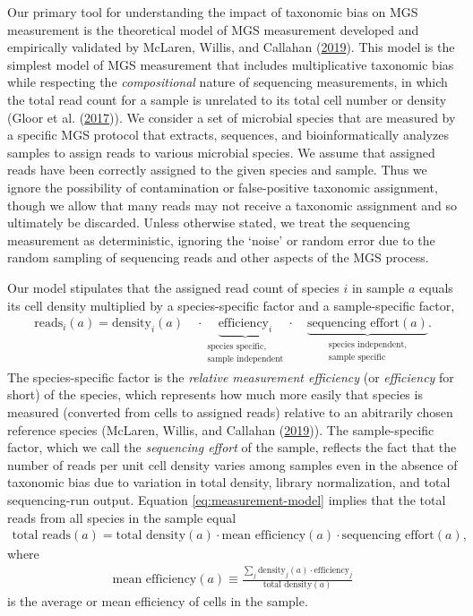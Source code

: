 \documentclass[
]{article}
\begin{document}
Our primary tool for understanding the impact of taxonomic bias on MGS measurement is the theoretical model of MGS measurement developed and empirically validated by McLaren, Willis, and Callahan (\protect\hyperlink{ref-mclaren2019cons}{2019}).
This model is the simplest model of MGS measurement that includes multiplicative taxonomic bias while respecting the \emph{compositional} nature of sequencing measurements, in which the total read count for a sample is unrelated to its total cell number or density (Gloor et al. (\protect\hyperlink{ref-gloor2017micr}{2017})).
We consider a set of microbial species that are measured by a specific MGS protocol that extracts, sequences, and bioinformatically analyzes samples to assign reads to various microbial species.
We assume that assigned reads have been correctly assigned to the given species and sample.
Thus we ignore the possibility of contamination or false-positive taxonomic assignment, though we allow that many reads may not receive a taxonomic assignment and so ultimately be discarded.
Unless otherwise stated, we treat the sequencing measurement as deterministic, ignoring the `noise' or random error due to the random sampling of sequencing reads and other aspects of the MGS process.

Our model stipulates that the assigned read count of species \(i\) in sample \(a\) equals its cell density multiplied by a species-specific factor and a sample-specific factor,
\begin{align}
  \label{eq:measurement-model}
  \text{reads}_{i}(a)
  = \text{density}_{i}(a) \quad \cdot
    \underbrace{\text{efficiency}_{i}}_{\substack{\text{species specific,} \\  \text{sample independent}}}
    \cdot \quad
    \underbrace{\text{sequencing effort}(a)}_{\substack{\text{species independent,} \\  \text{sample specific}}}.
\end{align}
The species-specific factor is the \emph{relative measurement efficiency} (or \emph{efficiency} for short) of the species, which represents how much more easily that species is measured (converted from cells to assigned reads) relative to an abitrarily chosen reference species (McLaren, Willis, and Callahan (\protect\hyperlink{ref-mclaren2019cons}{2019})).
The sample-specific factor, which we call the \emph{sequencing effort} of the sample, reflects the fact that the number of reads per unit cell density varies among samples even in the absence of taxonomic bias due to variation in total density, library normalization, and total sequencing-run output.
Equation \eqref{eq:measurement-model} implies that the total reads from all species in the sample equal
\begin{align}
  \label{eq:total-reads}
  \text{total reads}(a)
    = \text{total density}(a) \cdot \text{mean efficiency}(a) \cdot \text{sequencing effort}(a),
\end{align}
where
\begin{align}
  \label{eq:mean-efficiency}
  \text{mean efficiency}(a) 
  \equiv \frac{\sum_{j}\text{density}_j(a)\cdot \text{efficiency}_j}{\text{total density}(a)}
\end{align}
is the average or mean efficiency of cells in the sample.
\end{document}
